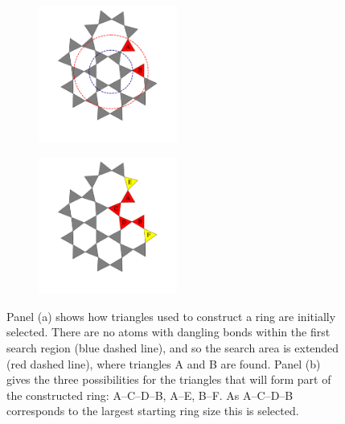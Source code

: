 \begin{figure}[bt]
     \centering
     
     \begin{subfigure}[b]{0.45\textwidth}
         \centering
         \includegraphics[width=0.5\textwidth]{./figures/bilayers/alg_search_1.pdf}
         \vspace{-1mm}
         \caption{}
         \label{fig:triraftalgsearch1}
     \end{subfigure}
	\begin{subfigure}[b]{0.45\textwidth}
         \centering
         \includegraphics[width=0.5\textwidth]{./figures/bilayers/alg_search_2.pdf}
         \caption{}
         \label{fig:triraftalgsearch2}
     \end{subfigure}
   
     \caption{Panel (a) shows how triangles used to construct a ring are initially selected. There are no atoms with dangling bonds within the first search region (blue dashed line), and so the search area is extended (red dashed line), where triangles A and B are found. Panel (b) gives the three possibilities for the triangles that will form part of the constructed ring: A–C–D–B, A–E, B–F. As A–C–D–B corresponds to the largest starting ring size this is selected.}
     \label{fig:triraftalgsearch}
     

\end{figure}
